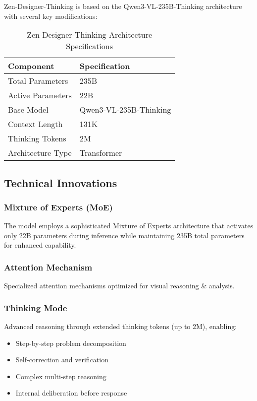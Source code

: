 \documentclass[11pt,a4paper]{article}
\begin{document}
Zen-Designer-Thinking is based on the Qwen3-VL-235B-Thinking architecture with several key modifications:

\begin{table}[H]
\centering
\begin{tabular}{ll}
\toprule
\textbf{Component} & \textbf{Specification} \\
\midrule
Total Parameters & 235B \\
Active Parameters & 22B \\
Base Model & Qwen3-VL-235B-Thinking \\
Context Length & 131K \\
Thinking Tokens & 2M \\


Architecture Type & Transformer \\
\bottomrule
\end{tabular}
\caption{Zen-Designer-Thinking Architecture Specifications}
\end{table}

\subsection{Technical Innovations}

\subsubsection{Mixture of Experts (MoE)}
The model employs a sophisticated Mixture of Experts architecture that activates only 22B parameters 
during inference while maintaining 235B total parameters for enhanced capability.

\subsubsection{Attention Mechanism}
Specialized attention mechanisms optimized for visual reasoning & analysis.

\subsubsection{Thinking Mode}
Advanced reasoning through extended thinking tokens (up to 2M), enabling:
\begin{itemize}
    \item Step-by-step problem decomposition
    \item Self-correction and verification
    \item Complex multi-step reasoning
    \item Internal deliberation before response
\end{itemize}
\end{document}
